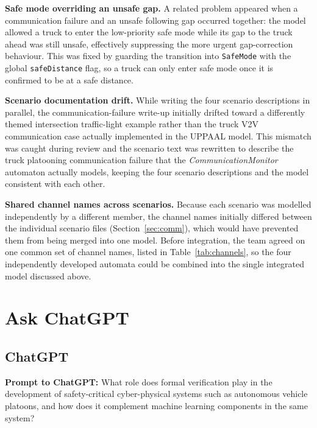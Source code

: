 \documentclass[english]{lni}
\begin{document}
\textbf{Safe mode overriding an unsafe gap.} A related problem appeared when a communication failure and an unsafe following gap occurred together: the model allowed a truck to enter the low-priority safe mode while its gap to the truck ahead was still unsafe, effectively suppressing the more urgent gap-correction behaviour. This was fixed by guarding the transition into \texttt{SafeMode} with the global \texttt{safeDistance} flag, so a truck can only enter safe mode once it is confirmed to be at a safe distance.

\textbf{Scenario documentation drift.} While writing the four scenario descriptions in parallel, the communication-failure write-up initially drifted toward a differently themed intersection traffic-light example rather than the truck V2V communication case actually implemented in the UPPAAL model. This mismatch was caught during review and the scenario text was rewritten to describe the truck platooning communication failure that the \emph{CommunicationMonitor} automaton actually models, keeping the four scenario descriptions and the model consistent with each other.

\textbf{Shared channel names across scenarios.} Because each scenario was modelled independently by a different member, the channel names initially differed between the individual scenario files (Section~\ref{sec:comm}), which would have prevented them from being merged into one model. Before integration, the team agreed on one common set of channel names, listed in Table~\ref{tab:channels}, so the four independently developed automata could be combined into the single integrated model discussed above.

\section{Ask ChatGPT}

\subsection{ChatGPT}
\textbf{Prompt to ChatGPT:} What role does formal verification play in the development of safety-critical cyber-physical systems such as autonomous vehicle platoons, and how does it complement machine learning components in the same system?
\end{document}
